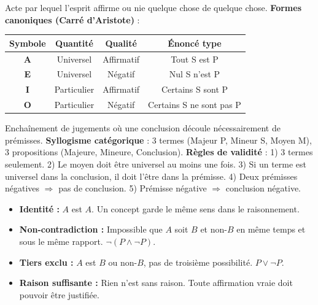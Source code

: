 \documentclass[11pt]{article}
\begin{document}
\begin{definition}[Jugement]
Acte par lequel l'esprit affirme ou nie quelque chose de quelque chose. \textbf{Formes canoniques (Carré d'Aristote)} :
\begin{center}
\begin{tabular}{|c|c|c|c|}\hline
Symbole & Quantité & Qualité & Énoncé type \\ \hline
\textbf{A} & Universel & Affirmatif & Tout S est P \\ \hline
\textbf{E} & Universel & Négatif & Nul S n'est P \\ \hline
\textbf{I} & Particulier & Affirmatif & Certains S sont P \\ \hline
\textbf{O} & Particulier & Négatif & Certains S ne sont pas P \\ \hline
\end{tabular}
\end{center}
\end{definition}

\begin{definition}
Enchaînement de jugements où une conclusion découle nécessairement de prémisses. \textbf{Syllogisme catégorique} : 3 termes (Majeur P, Mineur S, Moyen M), 3 propositions (Majeure, Mineure, Conclusion). \textbf{Règles de validité} : 1) 3 termes seulement. 2) Le moyen doit être universel au moins une fois. 3) Si un terme est universel dans la conclusion, il doit l'être dans la prémisse. 4) Deux prémisses négatives $\Rightarrow$ pas de conclusion. 5) Prémisse négative $\Rightarrow$ conclusion négative.
\end{definition}

\begin{propriete}
\begin{itemize}
    \item \textbf{Identité :} $A$ est $A$. Un concept garde le même sens dans le raisonnement.
    \item \textbf{Non-contradiction :} Impossible que $A$ soit $B$ et non-$B$ en même temps et sous le même rapport. $\neg(P \land \neg P)$.
    \item \textbf{Tiers exclu :} $A$ est $B$ ou non-$B$, pas de troisième possibilité. $P \lor \neg P$.
    \item \textbf{Raison suffisante :} Rien n'est sans raison. Toute affirmation vraie doit pouvoir être justifiée.
\end{itemize}
\end{propriete}
\end{document}
